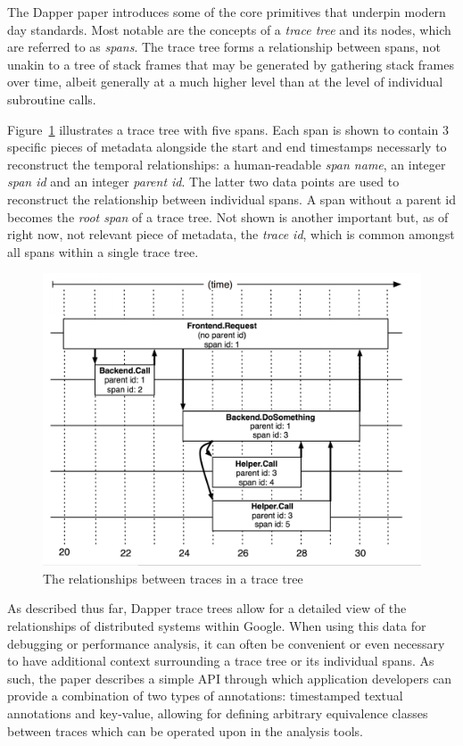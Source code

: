 \documentclass[pdftex,titlepage]{article}
\begin{document}
        The Dapper paper introduces some of the core primitives that underpin modern day standards. Most notable are the concepts
        of a \textit{trace tree} and its nodes, which are referred to as \textit{spans}. The trace tree forms a relationship between
        spans, not unakin to a tree of stack frames that may be generated by gathering stack frames over time, albeit generally
        at a much higher level than at the level of individual subroutine calls. 

        Figure~\ref{fig:dappertrace} illustrates a trace tree with five spans. Each span is shown to contain 3 specific pieces of
        metadata alongside the start and end timestamps necessarly to reconstruct the temporal relationships: a human-readable
        \textit{span name}, an integer \textit{span id} and an integer \textit{parent id}. The latter two
        data points are used to reconstruct the relationship between individual spans. A span without a parent id becomes the 
        \textit{root span} of a trace tree. Not shown is another important but, as of right now, not relevant piece of metadata, the 
        \textit{trace id}, which is common amongst all spans within a single trace tree.

        \begin{figure}[htb!]
            \centering
            \includegraphics[scale=1]{dappertrace}
            \caption{The relationships between traces in a trace tree}
            \label{fig:dappertrace}
        \end{figure}

        As described thus far, Dapper trace trees allow for a detailed view of the relationships of distributed systems within
        Google. When using this data for debugging or performance analysis, it can often be convenient or even necessary to 
        have additional context surrounding a trace tree or its individual spans. As such, the paper describes a simple API 
        through which application developers can provide a combination of two types of annotations: timestamped textual annotations
        and key-value, allowing for defining arbitrary equivalence classes between traces which can be operated upon in the analysis
        tools.
\end{document}
